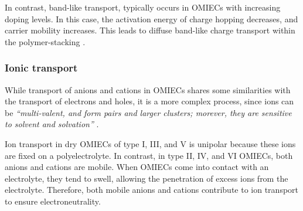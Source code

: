 In contrast, band-like transport, typically occurs in OMIECs with increasing doping levels. In this case, the activation energy of charge hopping decreases, and carrier mobility increases. This leads to diffuse band-like charge transport within the polymer-stacking \cite{wangHoppingTransportHall2012}.



\subsubsection{Ionic transport}
While transport of anions and cations in OMIECs shares some similarities with the transport of electrons and holes, it is a more complex process, since ions can be \textit{``multi-valent, and form pairs and larger clusters; morever, they are sensitive to solvent and solvation''} \cite{paulsenOrganicMixedIonic2020}.

Ion transport in dry OMIECs of type I, III, and V is unipolar because these ions are fixed on a polyelectrolyte. In contrast, in type II, IV, and VI OMIECs, both anions and cations are mobile. When OMIECs come into contact with an electrolyte, they tend to swell, allowing the penetration of excess ions from the electrolyte. Therefore, both mobile anions and cations contribute to ion transport to ensure electroneutrality. 


